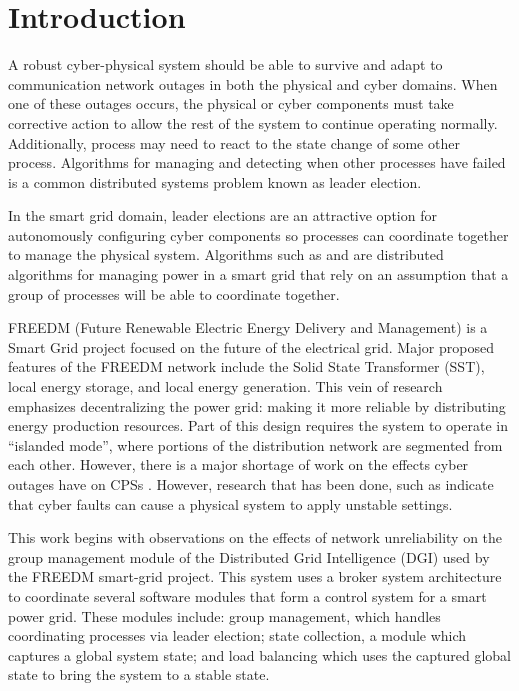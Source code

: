 \chapter{Introduction}
A robust cyber-physical system should be able to survive and adapt to communication network outages in both the physical and cyber domains. When one of these outages occurs, the physical or cyber components must take corrective action to allow the rest of the system to continue operating normally. Additionally, process may need to react to the state change of some other process. Algorithms for managing and detecting when other processes have failed is a common distributed systems problem known as leader election.

In the smart grid domain, leader elections are an attractive option for autonomously configuring cyber components so processes can coordinate together to manage the physical system. Algorithms such as \cite{LOADBALANCING} and \cite{INCREMENTALCONSENSUS} are distributed algorithms for managing power in a smart grid that rely on an assumption that a group of processes will be able to coordinate together. 

FREEDM (Future Renewable Electric Energy Delivery and Management) is a Smart Grid project focused on the future of the electrical grid. Major proposed features of the FREEDM network include the Solid State Transformer (SST), local energy storage, and local energy generation\cite{FREEDMMIGRATION}. This vein of research emphasizes decentralizing the power grid: making it more reliable by distributing energy production resources. Part of this design requires the system to operate in “islanded mode”, where portions of the distribution network are segmented from each other. However, there is a major shortage of work on the effects cyber outages have on CPSs \cite{CYBERRESEARCHCALL} \cite{SMARTGRIDBENEFITS}. However, research that has been done, such as \cite{HARINI} indicate that cyber faults can cause a physical system to apply unstable settings.

This work begins with observations on the effects of network unreliability on the group management module of the Distributed Grid Intelligence (DGI) used by the FREEDM smart-grid project. This system uses a broker system architecture to coordinate several software modules that form a control system for a smart power grid. These modules include: group management, which handles coordinating processes via leader election; state collection, a module which captures a global system state; and load balancing which uses the captured global state to bring the system to a stable state.

